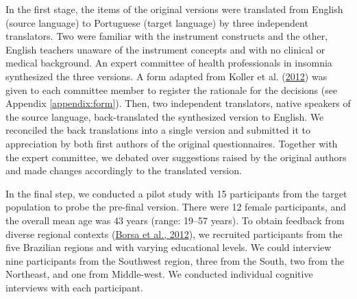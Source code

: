 \documentclass[
  ,doc,11pt, twoside,floatsintext]{apa6}
\begin{document}
In the first stage, the items of the original versions were translated from English (source language) to Portuguese (target language) by three independent translators. Two were familiar with the instrument constructs and the other, English teachers unaware of the instrument concepts and with no clinical or medical background. An expert committee of health professionals in insomnia synthesized the three versions. A form adapted from Koller et al. (\protect\hyperlink{ref-koller2012}{2012}) was given to each committee member to register the rationale for the decisions (see Appendix \ref{appendix:form}). Then, two independent translators, native speakers of the source language, back-translated the synthesized version to English. We reconciled the back translations into a single version and submitted it to appreciation by both first authors of the original questionnaires. Together with the expert committee, we debated over suggestions raised by the original authors and made changes accordingly to the translated version.

In the final step, we conducted a pilot study with 15 participants from the target population to probe the pre-final version. There were 12 female participants, and the overall mean age was 43 years (range: 19--57 years). To obtain feedback from diverse regional contexts (\protect\hyperlink{ref-borsaAdaptacaoValidacaoInstrumentos2012}{Borsa et al., 2012}), we recruited participants from the five Brazilian regions and with varying educational levels. We could interview nine participants from the Southwest region, three from the South, two from the Northeast, and one from Middle-west. We conducted individual cognitive interviews with each participant.
\end{document}
